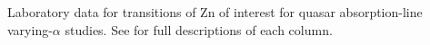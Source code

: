 Laboratory data for transitions of Zn of interest for quasar absorption-line varying-$\alpha$ studies. See  for full descriptions of each column.
